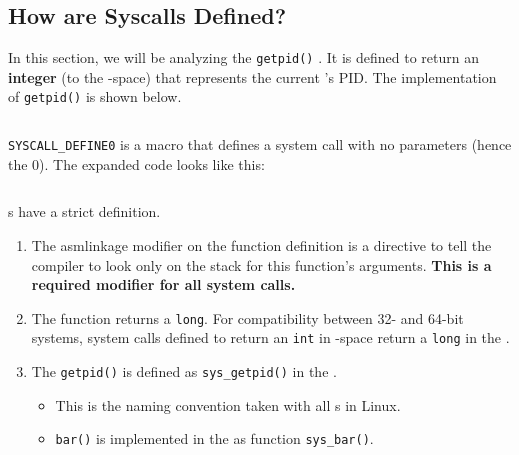 \subsection{How are Syscalls Defined?}\label{subsec:How_Syscalls_Defined}
In this section, we will be analyzing the \texttt{getpid()} .
It is defined to return an \textbf{integer} (to the -space) that represents the current 's PID.\@
The implementation of \texttt{getpid()} is shown below.
\inputminted[frame=lines,linenos]{c}{./EDAF35-Operating_Systems-Sections/System_Calls/Code/getpid_Implementation.c}

\texttt{SYSCALL_DEFINE0} is a macro that defines a system call with no parameters (hence the 0).
The expanded code looks like this:
\inputminted[frame=lines,linenos]{c}{./EDAF35-Operating_Systems-Sections/System_Calls/Code/getpid_Expanded.c}

s have a strict definition.
\begin{enumerate}[noitemsep]
\item The asmlinkage modifier on the function definition is a directive to tell the compiler to look only on the stack for this function’s arguments.
  \textbf{This is a required modifier for all system calls.}
\item The function returns a \texttt{long}.
  For compatibility between 32- and 64-bit systems, system calls defined to return an \texttt{int} in -space return a \texttt{long} in the .
\item The \texttt{getpid()}  is defined as \texttt{sys_getpid()} in the .
  \begin{itemize}[noitemsep]
  \item This is the naming convention taken with all s in Linux.
  \item {} \texttt{bar()} is implemented in the  as function \texttt{sys_bar()}.
  \end{itemize}
\end{enumerate}


